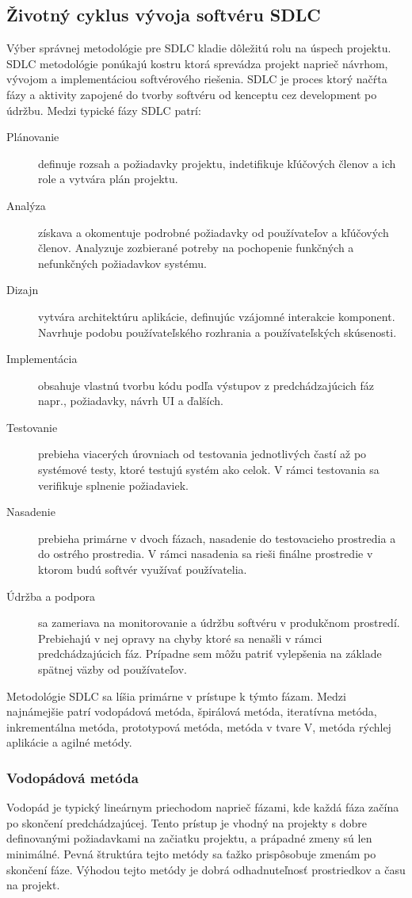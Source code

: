 \subsection{Životný cyklus vývoja softvéru SDLC}
Výber správnej metodológie pre SDLC kladie dôležitú rolu na úspech projektu. SDLC metodológie ponúkajú kostru ktorá sprevádza projekt naprieč návrhom, vývojom a implementáciou softvérového riešenia. SDLC je proces ktorý načŕta fázy a aktivity zapojené do tvorby softvéru od kenceptu cez development po údržbu. Medzi typické fázy SDLC patrí:
\begin{description}
    \item[Plánovanie] definuje rozsah a požiadavky projektu, indetifikuje kľúčových členov a ich role a vytvára plán projektu.
    \item[Analýza] získava a okomentuje podrobné požiadavky od používateľov a kľúčových členov. Analyzuje zozbierané potreby na pochopenie funkčných a nefunkčných požiadavkov systému.
    \item[Dizajn] vytvára architektúru aplikácie, definujúc vzájomné interakcie komponent. Navrhuje podobu používateľského rozhrania a používateľských skúsenosti.
    \item[Implementácia] obsahuje vlastnú tvorbu kódu podľa výstupov z predchádzajúcich fáz napr., požiadavky, návrh UI a ďalších.
    \item[Testovanie] prebieha viacerých úrovniach od testovania jednotlivých častí až po systémové testy, ktoré testujú systém ako celok. V rámci testovania sa verifikuje splnenie požiadaviek.
    \item[Nasadenie] prebieha primárne v dvoch fázach, nasadenie do testovacieho prostredia a do ostrého prostredia. V rámci nasadenia sa rieši finálne prostredie v ktorom budú softvér využívať používatelia.
    \item[Údržba a podpora] sa zameriava na monitorovanie a údržbu softvéru v produkčnom prostredí. Prebiehajú v nej opravy na chyby ktoré sa nenašli v rámci predchádzajúcich fáz. Prípadne sem môžu patriť vylepšenia na základe spätnej väzby od používateľov.
\end{description}

Metodológie SDLC sa líšia primárne v prístupe k týmto fázam. \cite{sdlc,sdlc-phases} Medzi najnámejšie patrí vodopádová metóda, špirálová metóda, iteratívna metóda, inkrementálna metóda, prototypová metóda, metóda v tvare V, metóda rýchlej aplikácie a agilné metódy.

\subsubsection{Vodopádová metóda}
Vodopád je typický lineárnym priechodom naprieč fázami, kde každá fáza začína po skončení predchádzajúcej. Tento prístup je vhodný na projekty s dobre definovanými požiadavkami na začiatku projektu, a prápadné zmeny sú len minimálné. Pevná štruktúra tejto metódy sa ťažko prispôsobuje zmenám po skončení fáze. Výhodou tejto metódy je dobrá odhadnuteľnosť prostriedkov a času na projekt.

